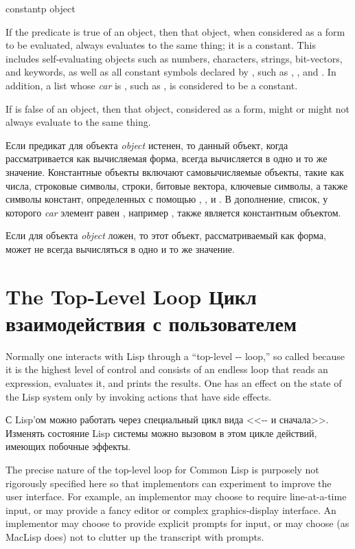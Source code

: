 \begin{defun}[Function]
constantp object

If the predicate  is true of an object,
then that object, when considered as a form to
be evaluated, always evaluates to the same thing;
it is a constant.
This includes self-evaluating objects such as numbers, characters,
strings, bit-vectors, and keywords, as well as all constant symbols
declared by ,
such as , , and .
In addition, a list whose \emph{car} is ,
such as , is considered to be a constant.

If  is false of an object, then
that object, considered as a form,
might or might not always evaluate to the same thing.

Если предикат  для объекта \emph{object} истенен, то данный
объект, когда рассматривается как вычисляемая форма, всегда вычисляется в одно и
то же значение.
Константные объекты включают самовычисляемые объекты, такие как числа, строковые
символы, строки, битовые вектора, ключевые символы, а также символы констант,
определенных с помощью , ,  и .
В дополнение, список, у которого \emph{car} элемент равен , например
, также является константным объектом.

Если  для объекта \emph{object} ложен, то этот объект,
рассматриваемый как форма, может не всегда вычисляться в одно и то же
значение.
\end{defun}

\section{The Top-Level Loop Цикл взаимодействия с пользователем}

Normally one interacts with Lisp through a ``top-level
-- loop,'' so called because
it is the highest level of control and consists of an endless
loop that reads an expression, evaluates it, and prints the
results.  One has an effect on the state of the Lisp system
only by invoking actions that have side effects.

С Lisp'ом можно работать через специальный цикл вида
<<-- и сначала>>.
Изменять состояние Lisp системы можно вызовом в этом цикле действий, имеющих
побочные эффекты.  

The precise nature of the top-level loop for Common Lisp
is purposely not rigorously specified here so that implementors can
experiment to improve the user interface.
For example, an implementor may choose to require line-at-a-time
input, or may provide a fancy editor or complex graphics-display
interface.  An implementor may choose to provide
explicit prompts for input,
or may choose (as MacLisp does) not to clutter up the transcript
with prompts.

